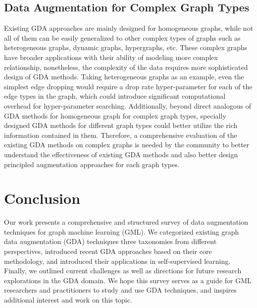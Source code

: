 \documentclass[11pt]{article}
\begin{document}
\subsection{Data Augmentation for Complex Graph Types}
Existing GDA approaches are mainly designed for homogeneous graphs, while not all of them can be easily generalized to other complex types of graphs such as heterogeneous graphs, dynamic graphs, hypergraphs, etc. These complex graphs have broader applications with their ability of modeling more complex relationship, nonetheless, the complexity of the data requires more sophisticated design of GDA methods. Taking heterogeneous graphs as an example, even the simplest edge dropping would require a drop rate hyper-parameter for each of the edge types in the graph, which could introduce significant computational overhead for hyper-parameter searching. Additionally, beyond direct analogous of GDA methods for homogeneous graph for complex graph types, specially designed GDA methods for different graph types could better utilize the rich information contained in them. Therefore, a comprehensive evaluation of the existing GDA methods on complex graphs is needed by the community to better understand the effectiveness of existing GDA methods and also better design principled augmentation approaches for each graph types.

\section{Conclusion}
\label{sec:tong_conclusion}
Our work presents a comprehensive and structured survey of data augmentation techniques for graph machine learning (GML). We categorized existing graph data augmentation (GDA) techniques three taxonomies from different perspectives, introduced recent GDA approaches based on their core methodology, and introduced their applications in self-supervised learning. Finally, we outlined current challenges as well as directions for future research explorations in the GDA domain. We hope this survey serves as a guide for GML researchers and practitioners to study and use GDA techniques, and inspires additional interest and work on this topic.

% 
% 
\end{document}
